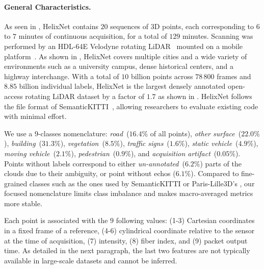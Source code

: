 \documentclass[runningheads]{tpls/llncs}
\begin{document}
\paragraph{General Characteristics.}
As seen in , HelixNet contains $20$ sequences of 3D points, each corresponding to $6$ to $7$ minutes of continuous acquisition, for a total of $129$ minutes. Scanning was performed by an HDL-64E Velodyne rotating LiDAR~\cite{velodyne} mounted on a mobile platform~\cite{stereopolis}. 
As shown in , HelixNet covers multiple cities and a wide variety of environments such as a university campus, dense historical centers, and a highway interchange.
With a total of $10$ billion points across $78\,800$ frames and $8.85$ billion individual labels, HelixNet is the largest densely annotated open-access rotating LiDAR dataset by a factor of $1.7$ as shown in . HelixNet follows the file format of SemanticKITTI~\cite{behley2019iccv}, allowing researchers to evaluate existing code with minimal effort.

We use a $9$-classes nomenclature: \emph{road}~($16.4\%$ of all points), \emph{other surface}~($22.0\%$), \emph{building}~($31.3\%$), \emph{vegetation}~($8.5\%$), \emph{traffic signs}~($1.6\%$), \emph{static vehicle}~($4.9\%$), \emph{moving vehicle}~($2.1\%$), \emph{pedestrian}~($0.9\%$), and \emph{acquisition artifact}~($0.05\%$). 
Points without labels correspond to either \emph{un-annotated}~($6.2\%$) parts of the clouds due to their ambiguity, or point without echos ($6.1\%$).
Compared to fine-grained classes such as the ones used by SemanticKITTI \cite{behley2019iccv} or Paris-Lille3D's \cite{roynard2017parislille3d}, our focused nomenclature limits class imbalance and makes macro-averaged metrics more stable.

Each point is associated with the $9$ following values: (1-3) Cartesian coordinates in a fixed frame of a reference, (4-6) cylindrical coordinate relative to the sensor at the time of acquisition, (7) intensity, (8) fiber index, and (9) packet output time. As detailed in the next paragraph, the last two features are not typically available in large-scale datasets and cannot be inferred. 
\end{document}
